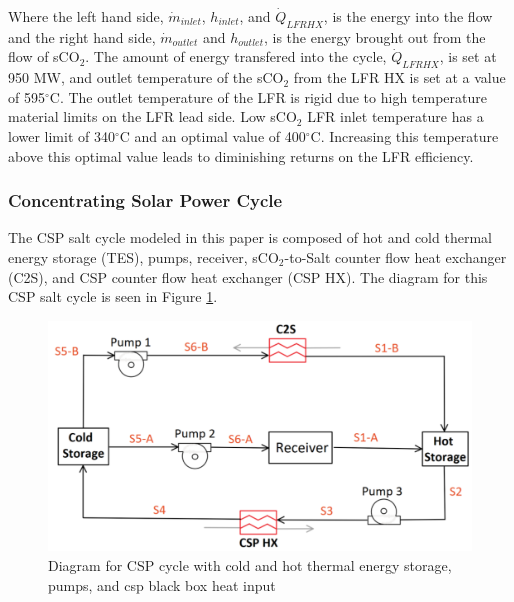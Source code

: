 \begin{paracol}{2}
Where the left hand side, $\dot{m}_{inlet}$, $h_{inlet}$, and $\dot{Q}_{LFRHX}$, is the energy into the flow and the right hand side, $\dot{m}_{outlet}$ and $h_{outlet}$, is the energy brought out from the flow of sCO$_2$. The amount of energy transfered into the cycle, $\dot{Q}_{LFRHX}$, is set at 950 MW, and outlet temperature of the sCO$_2$ from the LFR HX is set at a value of 595$^{\circ}$C. The outlet temperature of the LFR is rigid due to high temperature material limits on the LFR lead side. Low sCO$_2$ LFR inlet temperature has a lower limit of 340$^{\circ}$C and an optimal value of 400$^{\circ}$C. Increasing this temperature above this optimal value leads to diminishing returns on the LFR efficiency.


\subsubsection{Concentrating Solar Power Cycle}

The CSP salt cycle modeled in this paper is composed of hot and cold thermal energy storage (TES), pumps, receiver, sCO$_2$-to-Salt counter flow heat exchanger (C2S), and CSP counter flow heat exchanger (CSP HX). The diagram for this CSP salt cycle is seen in Figure \ref{csp}. 

\end{paracol}
\begin{figure}[H] 
    \widefigure
    \includegraphics[width=10 cm]{Definitions/csp.pdf}
    \caption{Diagram for CSP cycle with cold and hot thermal energy storage, pumps, and csp black box heat input\label{csp}}
\end{figure}
